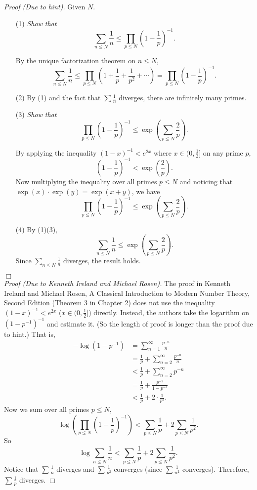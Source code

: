 \documentclass{article}
\begin{document}
\emph{Proof (Due to hint).}
Given $N$.
\begin{enumerate}
\item[(1)]
\emph{Show that
\[
  \sum_{n \leq N} \frac{1}{n}
  \leq \prod_{p \leq N} \left( 1 - \frac{1}{p} \right)^{-1}.
\]}

By the unique factorization theorem on $n \leq N$,
\[
  \sum_{n \leq N} \frac{1}{n}
  \leq \prod_{p \leq N} \left( 1 + \frac{1}{p} + \frac{1}{p^2} + \cdots \right)
  = \prod_{p \leq N} \left( 1 - \frac{1}{p} \right)^{-1}.
\]

\item[(2)]
By (1) and the fact that $\sum \frac{1}{n}$ diverges,
there are infinitely many primes.

\item[(3)]
\emph{Show that
\[
  \prod_{p \leq N} \left( 1 - \frac{1}{p} \right)^{-1}
  \leq \exp \left( \sum_{p \leq N} \frac{2}{p} \right).
\]}

By applying the inequality $(1 - x)^{-1} < e^{2x}$ where $x \in (0, \frac{1}{2}]$
on any prime $p$,
\[
  \left( 1 - \frac{1}{p} \right)^{-1} < \exp \left( \frac{2}{p} \right).
\]
Now multiplying the inequality over all primes $p \leq N$ and noticing that
$\exp(x) \cdot \exp(y) = \exp(x + y)$, we have
\[
  \prod_{p \leq N} \left( 1 - \frac{1}{p} \right)^{-1}
  \leq \exp \left( \sum_{p \leq N} \frac{2}{p} \right).
\]

\item[(4)]
By (1)(3),
\[
  \sum_{n \leq N} \frac{1}{n}
  \leq \exp \left( \sum_{p \leq N} \frac{2}{p} \right).
\]
Since $\sum_{n \leq N} \frac{1}{n}$ diverges, the result holds.
\end{enumerate}
$\Box$ \\



\emph{Proof (Due to Kenneth Ireland and Michael Rosen).}
The proof in Kenneth Ireland and Michael Rosen,
A Classical Introduction to Modern Number Theory, Second Edition (Theorem 3 in Chapter 2)
does not use the inequality $(1 - x)^{-1} < e^{2x}$ ($x \in (0, \frac{1}{2}]$) directly.
Instead, the authors take the logarithm on $(1 - p^{-1})^{-1}$ and estimate it.
(So the length of proof is longer than the proof due to hint.)
That is,
\begin{align*}
- \log(1 - p^{-1})
&= \sum_{n = 1}^{\infty} \frac{p^{-n}}{n} \\
&= \frac{1}{p} + \sum_{n = 2}^{\infty} \frac{p^{-n}}{n} \\
&< \frac{1}{p} + \sum_{n = 2}^{\infty} p^{-n} \\
&= \frac{1}{p} + \frac{p^{-2}}{1 - p^{-1}} \\
&< \frac{1}{p} + 2 \cdot \frac{1}{p^2}.
\end{align*}
Now we sum over all primes $p \leq N$,
$$\log \left( \prod_{p \leq N} \left( 1 - \frac{1}{p} \right)^{-1} \right)
< \sum_{p \leq N} \frac{1}{p} + 2 \sum_{p \leq N} \frac{1}{p^2}.$$
So
$$\log \sum_{n \leq N} \frac{1}{n}
< \sum_{p \leq N} \frac{1}{p} + 2 \sum_{p \leq N} \frac{1}{p^2}.$$
Notice that $\sum \frac{1}{n}$ diverges and $\sum \frac{1}{p^2}$ converges
(since $\sum \frac{1}{n^2}$ converges).
Therefore, $\sum \frac{1}{p}$ diverges.
$\Box$ \\
\end{document}
